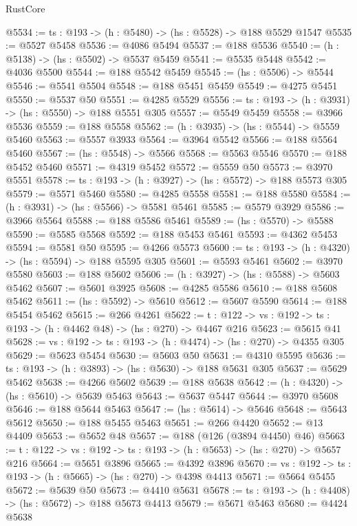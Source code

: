 \begin{lexlean}{RustCore}
\begin{coremodule}
@5534 := {ts : @193} -> (h : @5480) -> (hs : @5528) -> @188 @5529 @1547
@5535 := @5527 @5458
@5536 := @4086 @5494
@5537 := @188 @5536
@5540 := (h : @5138) -> (hs : @5502) -> @5537 @5459
@5541 := @5535 @5448
@5542 := @4036 @5500
@5544 := @188 @5542 @5459
@5545 := (hs : @5506) -> @5544
@5546 := @5541 @5504
@5548 := @188 @5451 @5459
@5549 := @4275 @5451
@5550 := @5537 @50
@5551 := @4285 @5529
@5556 := {ts : @193} -> (h : @3931) -> (hs : @5550) -> @188 @5551 @305
@5557 := @5549 @5459
@5558 := @3966 @5536
@5559 := @188 @5558
@5562 := (h : @3935) -> (hs : @5544) -> @5559 @5460
@5563 := @5557 @3933
@5564 := @3964 @5542
@5566 := @188 @5564 @5460
@5567 := (hs : @5548) -> @5566
@5568 := @5563 @5546
@5570 := @188 @5452 @5460
@5571 := @4319 @5452
@5572 := @5559 @50
@5573 := @3970 @5551
@5578 := {ts : @193} -> (h : @3927) -> (hs : @5572) -> @188 @5573 @305
@5579 := @5571 @5460
@5580 := @4285 @5558
@5581 := @188 @5580
@5584 := (h : @3931) -> (hs : @5566) -> @5581 @5461
@5585 := @5579 @3929
@5586 := @3966 @5564
@5588 := @188 @5586 @5461
@5589 := (hs : @5570) -> @5588
@5590 := @5585 @5568
@5592 := @188 @5453 @5461
@5593 := @4362 @5453
@5594 := @5581 @50
@5595 := @4266 @5573
@5600 := {ts : @193} -> (h : @4320) -> (hs : @5594) -> @188 @5595 @305
@5601 := @5593 @5461
@5602 := @3970 @5580
@5603 := @188 @5602
@5606 := (h : @3927) -> (hs : @5588) -> @5603 @5462
@5607 := @5601 @3925
@5608 := @4285 @5586
@5610 := @188 @5608 @5462
@5611 := (hs : @5592) -> @5610
@5612 := @5607 @5590
@5614 := @188 @5454 @5462
@5615 := @266 @4261
@5622 := {t : @122} -> {vs : @192} -> {ts : @193} -> (h : @4462 @48) -> (hs : @270) -> @4467 @216
@5623 := @5615 @41
@5628 := {vs : @192} -> {ts : @193} -> (h : @4474) -> (hs : @270) -> @4355 @305
@5629 := @5623 @5454
@5630 := @5603 @50
@5631 := @4310 @5595
@5636 := {ts : @193} -> (h : @3893) -> (hs : @5630) -> @188 @5631 @305
@5637 := @5629 @5462
@5638 := @4266 @5602
@5639 := @188 @5638
@5642 := (h : @4320) -> (hs : @5610) -> @5639 @5463
@5643 := @5637 @5447
@5644 := @3970 @5608
@5646 := @188 @5644 @5463
@5647 := (hs : @5614) -> @5646
@5648 := @5643 @5612
@5650 := @188 @5455 @5463
@5651 := @266 @4420
@5652 := @13 @4409
@5653 := @5652 @48
@5657 := @188 (@126 (@3894 @4450) @46)
@5663 := {t : @122} -> {vs : @192} -> {ts : @193} -> (h : @5653) -> (hs : @270) -> @5657 @216
@5664 := @5651 @3896
@5665 := @4392 @3896
@5670 := {vs : @192} -> {ts : @193} -> (h : @5665) -> (hs : @270) -> @4398 @4413
@5671 := @5664 @5455
@5672 := @5639 @50
@5673 := @4410 @5631
@5678 := {ts : @193} -> (h : @4408) -> (hs : @5672) -> @188 @5673 @4413
@5679 := @5671 @5463
@5680 := @4424 @5638

\end{coremodule}
\end{lexlean}
